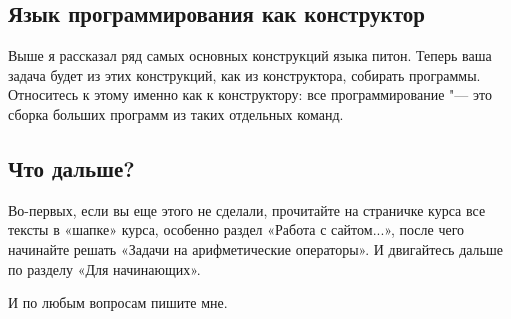 \subsection{Язык программирования как конструктор}
Выше я рассказал ряд самых основных конструкций языка питон. Теперь ваша задача будет из этих конструкций,
как из конструктора, собирать программы. Относитесь к этому именно как к конструктору: 
все программирование "--- это сборка больших программ из таких отдельных команд.

\subsection{Что дальше?}

Во-первых, если вы еще этого не сделали, прочитайте на страничке курса все тексты в «шапке» курса, 
особенно раздел «Работа с сайтом...», после чего начинайте решать «Задачи на арифметические операторы». И двигайтесь дальше по разделу «Для начинающих».

И по любым вопросам пишите мне.
